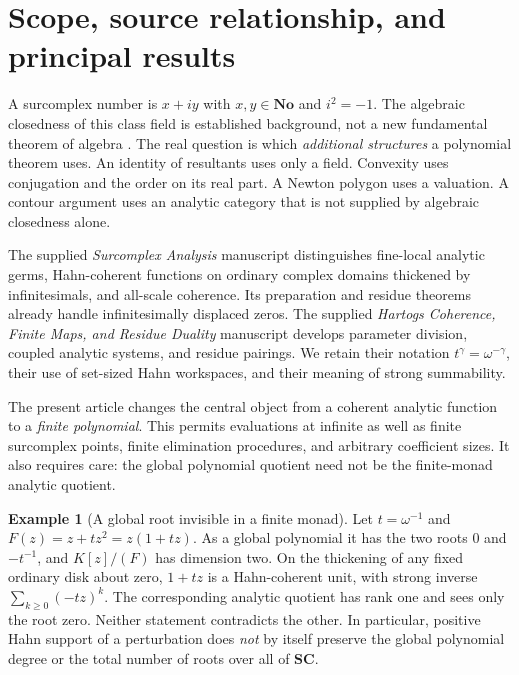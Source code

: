 \documentclass[11pt,letterpaper,oneside]{article}
\numberwithin{equation}{section}
\theoremstyle{definition}
\newtheorem{example}[theorem]{Example}
\theoremstyle{remark}\newtheorem{remark}[theorem]{Remark}
\newcommand{\No}{\mathbf{No}}\newcommand{\SC}{\mathbf{SC}}
\begin{document}
\hypersetup{pageanchor=true}
\setcounter{tocdepth}{1}\tableofcontents
\clearpage
{}

\section{Scope, source relationship, and principal results}\label{sec:scope}
A surcomplex number is $x+iy$ with $x,y\in\No$ and $i^2=-1$. The
algebraic closedness of this class field is established background, not a
new fundamental theorem of algebra \cite{Conway,Gonshor,vdDE,Poonen}.
The real question is which \emph{additional structures} a polynomial theorem
uses. An identity of resultants uses only a field. Convexity uses conjugation
and the order on its real part. A Newton polygon uses a valuation. A contour
argument uses an analytic category that is not supplied by algebraic
closedness alone.

The supplied \emph{Surcomplex Analysis} manuscript \cite{SourceAnalysis}
distinguishes fine-local analytic germs, Hahn-coherent functions on ordinary
complex domains thickened by infinitesimals, and all-scale coherence. Its
preparation and residue theorems already handle infinitesimally displaced
zeros. The supplied \emph{Hartogs Coherence, Finite Maps, and Residue Duality}
manuscript \cite{SourceResearch} develops parameter division, coupled analytic
systems, and residue pairings. We retain their notation $t^\gamma=
\omega^{-\gamma}$, their use of set-sized Hahn workspaces, and their meaning
of strong summability.

The present article changes the central object from a coherent analytic
function to a \emph{finite polynomial}. This permits evaluations at infinite
as well as finite surcomplex points, finite elimination procedures, and
arbitrary coefficient sizes. It also requires care: the global polynomial
quotient need not be the finite-monad analytic quotient.

\begin{example}[A global root invisible in a finite monad]\label{ex:escape}
Let $t=\omega^{-1}$ and $F(z)=z+tz^2=z(1+tz)$. As a global polynomial it
has the two roots $0$ and $-t^{-1}$, and $K[z]/(F)$ has dimension two.
On the thickening of any fixed ordinary disk about zero, $1+tz$ is a
Hahn-coherent unit, with strong inverse $\sum_{k\geq0}(-tz)^k$.
The corresponding analytic quotient has rank one and sees only the root
zero. Neither statement contradicts the other. In particular, positive
Hahn support of a perturbation does \emph{not} by itself preserve the global
polynomial degree or the total number of roots over all of $\SC$.
\end{example}
\end{document}
